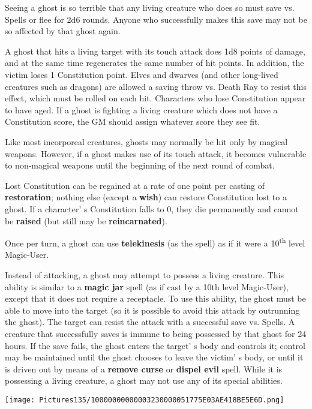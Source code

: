 \documentclass[a4paper,twoside,openany,10pt]{book}
\begin{document}
\begin{multicols}{2}
Seeing a ghost is so terrible that any living creature who does so must save vs. Spells or flee for 2d6 rounds. Anyone who successfully makes this save may not be so affected by that ghost again.

A ghost that hits a living target with its touch attack does 1d8 points of damage, and at the same time regenerates the same number of hit points. In addition, the victim loses 1 Constitution point. Elves and dwarves (and other long-lived creatures such as dragons) are allowed a saving throw vs. Death Ray to resist this effect, which must be rolled on each hit. Characters who lose Constitution appear to have aged. If a ghost is fighting a living creature which does not have a Constitution score, the GM should assign whatever score they see fit. 

Like most incorporeal creatures, ghosts may normally be hit only by magical weapons. However, if a ghost makes use of its touch attack, it becomes vulnerable to non-magical weapons until the beginning of the next round of combat.

Lost Constitution can be regained at a rate of one point per casting of \textbf{restoration}; nothing else (except a \textbf{wish}) can restore Constitution lost to a ghost. If a character' s Constitution falls to 0, they die permanently and cannot be \textbf{raised} (but still may be \textbf{reincarnated}).

Once per turn, a ghost can use \textbf{telekinesis} (as the spell) as if it were a 10\textsuperscript{th} level Magic-User.

Instead of attacking, a ghost may attempt to possess a living creature. This ability is similar to a \textbf{magic jar} spell (as if cast by a 10th level Magic-User), except that it does not require a receptacle. To use this ability, the ghost must be able to move into the target (so it is possible to avoid this attack by outrunning the ghost). The target can resist the attack with a successful save vs. Spells. A creature that successfully saves is immune to being possessed by that ghost for 24 hours. If the save fails, the ghost enters the target' s body and controls it; control may be maintained until the ghost chooses to leave the victim' s body, or until it is driven out by means of a \textbf{remove curse} or \textbf{dispel evil} spell. While it is possessing a living creature, a ghost may not use any of its special abilities.

\begin{center}
	\texttt{[image: Pictures135/10000000000003230000051775E03AE418BE5E6D.png]}
\end{center}




\end{multicols}
\end{document}
